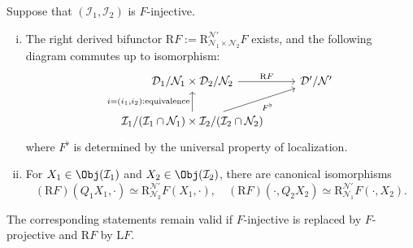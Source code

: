 \begin{proposition}\label{prop:localization-injective-bifunctor}
	Suppose that $(\mathcal{I}_1,\mathcal{I}_2)$ is $F$-injective.
	\begin{enumerate}[(i)]
		\item The right derived bifunctor
		$\mathrm{R}F:=\mathrm{R}^{\mathcal{N}'}_{\mathcal{N}_1\times\mathcal{N}_2}F$
		exists, and the following diagram commutes up to isomorphism:
		\[\begin{tikzcd}
			\mathcal{D}_1 /\mathcal{N}_1 \times \mathcal{D}_2 /\mathcal{N}_2 \arrow[r, "\mathrm{R}F"] & \mathcal{D}'/\mathcal{N}' \\
			\mathcal{I}_1 /(\mathcal{I}_1 \cap \mathcal{N}_1) \times \mathcal{I}_2 /(\mathcal{I}_2 \cap \mathcal{N}_2) \arrow[u, "{i = (i_1, i_2): \text{equivalence}}"] \arrow[ru, "{F^\flat}"'] &
		\end{tikzcd}\]
		where $F^\flat$ is determined by the universal property of localization.
		\item For $X_1\in\Obj(\mathcal{I}_1)$ and
		$X_2\in\Obj(\mathcal{I}_2)$, there are canonical isomorphisms
		\[ (\mathrm{R}F)(Q_1 X_1, \cdot) \simeq \mathrm{R}^{\mathcal{N}'}_{\mathcal{N}_2} F(X_1, \cdot), \quad (\mathrm{R}F)(\cdot, Q_2 X_2) \simeq \mathrm{R}^{\mathcal{N}'}_{\mathcal{N}_1} F(\cdot, X_2). \]
	\end{enumerate}
	The corresponding statements remain valid if $F$-injective is replaced by
	$F$-projective and $\mathrm{R}F$ by $\mathrm{L}F$.
\end{proposition}
